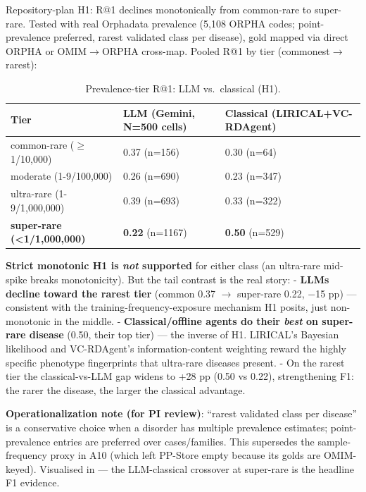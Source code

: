 Repository-plan H1: R@1 declines monotonically from common-rare to super-rare.
Tested with real Orphadata prevalence (5,108 ORPHA
codes; point-prevalence preferred, rarest validated class per disease), gold
mapped via direct ORPHA or OMIM\ensuremath{\rightarrow}ORPHA cross-map. Pooled R@1 by tier
(commonest\ensuremath{\rightarrow}rarest):

\begin{table}[t]
\centering\scriptsize\setlength{\tabcolsep}{3.5pt}
\caption{Prevalence-tier R@1: LLM vs.~classical (H1).}\label{tbl:h1tier}
\begin{tabular}{@{}
lll@{}}
\toprule
Tier & LLM (Gemini, N=500 cells) & Classical (LIRICAL+VC-RDAgent) \\
\midrule
common-rare (\ensuremath{\geq}1/10,000) & 0.37 (n=156) & 0.30 (n=64) \\
moderate (1-9/100,000) & 0.26 (n=690) & 0.23 (n=347) \\
ultra-rare (1-9/1,000,000) & 0.39 (n=693) & 0.33 (n=322) \\
\textbf{super-rare (\textless1/1,000,000)} & \textbf{0.22} (n=1167) & \textbf{0.50} (n=529) \\
\bottomrule
\end{tabular}
\end{table}

\textbf{Strict monotonic H1 is \emph{not} supported} for either class (an ultra-rare
mid-spike breaks monotonicity). But the tail contrast is the real story:
- \textbf{LLMs decline toward the rarest tier} (common 0.37 \ensuremath{\rightarrow} super-rare 0.22,
\ensuremath{-}15 pp) --- consistent with the training-frequency-exposure mechanism H1
posits, just non-monotonic in the middle.
- \textbf{Classical/offline agents do their \emph{best} on super-rare disease} (0.50,
their top tier) --- the inverse of H1. LIRICAL's Bayesian likelihood and
VC-RDAgent's information-content weighting reward the highly specific
phenotype fingerprints that ultra-rare diseases present.
- On the rarest tier the classical-vs-LLM gap widens to +28 pp (0.50 vs
0.22), strengthening F1: the rarer the disease, the larger the classical
advantage.

\textbf{Operationalization note (for PI review)}: ``rarest validated class per
disease'' is a conservative choice when a disorder has multiple prevalence
estimates; point-prevalence entries are preferred over cases/families.
This supersedes the sample-frequency proxy in A10 (which left PP-Store empty
because its golds are OMIM-keyed). Visualised in  --- the
LLM-classical crossover at super-rare is the headline F1 evidence.

